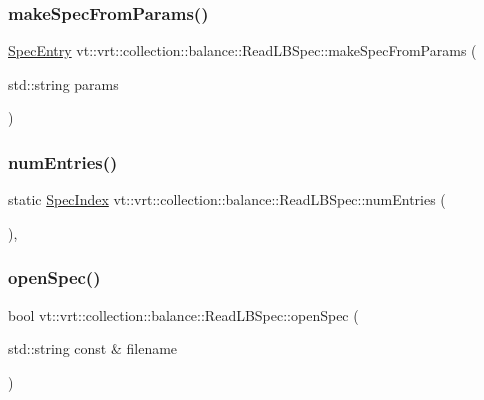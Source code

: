 \subsubsection{\texorpdfstring{make\+Spec\+From\+Params()}{makeSpecFromParams()}}
{\footnotesize\ttfamily \hyperlink{structvt_1_1vrt_1_1collection_1_1balance_1_1_spec_entry}{Spec\+Entry} vt\+::vrt\+::collection\+::balance\+::\+Read\+L\+B\+Spec\+::make\+Spec\+From\+Params (\begin{DoxyParamCaption}\item[{std\+::string}]{params }\end{DoxyParamCaption})\hspace{0.3cm}{\ttfamily [static]}}

\mbox{\label{structvt_1_1vrt_1_1collection_1_1balance_1_1_read_l_b_spec_ab7a988ed27206ee728474ad200c47291}} 
\subsubsection{\texorpdfstring{num\+Entries()}{numEntries()}}
{\footnotesize\ttfamily static \hyperlink{namespacevt_1_1vrt_1_1collection_1_1balance_a72a5e0d9936ddf57f8e6c64e0e9fd123}{Spec\+Index} vt\+::vrt\+::collection\+::balance\+::\+Read\+L\+B\+Spec\+::num\+Entries (\begin{DoxyParamCaption}{ }\end{DoxyParamCaption})\hspace{0.3cm}{\ttfamily [inline]}, {\ttfamily [static]}}

\mbox{\label{structvt_1_1vrt_1_1collection_1_1balance_1_1_read_l_b_spec_a7da8702619a292b50188ff15c6e88c71}} 
\subsubsection{\texorpdfstring{open\+Spec()}{openSpec()}}
{\footnotesize\ttfamily bool vt\+::vrt\+::collection\+::balance\+::\+Read\+L\+B\+Spec\+::open\+Spec (\begin{DoxyParamCaption}\item[{std\+::string const \&}]{filename }\end{DoxyParamCaption})\hspace{0.3cm}{\ttfamily [static]}}



